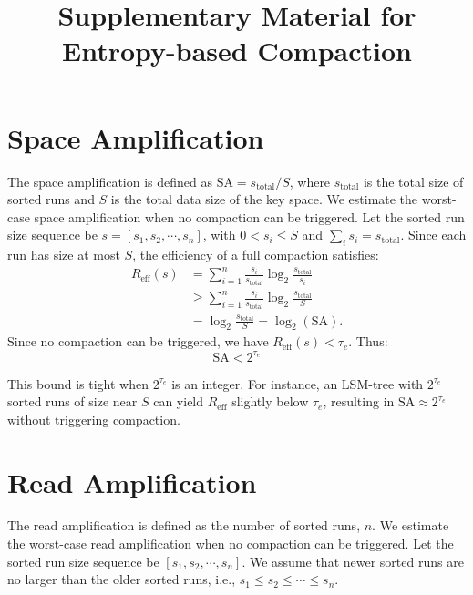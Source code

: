 \documentclass[sigconf]{acmart}
\begin{document}
\title{Supplementary Material for Entropy-based Compaction}
\maketitle

\section{Space Amplification}

The space amplification is defined as $\text{SA} = s_\text{total} / S$, where $s_\text{total}$ is the total size of sorted runs and $S$ is the total data size of the key space. We estimate the worst-case space amplification when no compaction can be triggered. Let the sorted run size sequence be $s = [s_1,s_2,\cdots,s_n]$, with $0 < s_i \le S$ and $\sum_i s_i = s_\text{total}$. Since each run has size at most $S$, the efficiency of a full compaction satisfies:
\begin{align*}
R_\text{eff}(s)
&= \sum_{i=1}^n \frac{s_i}{s_\text{total}} \log_2 \frac{s_\text{total}}{s_i} \\
&\ge \sum_{i=1}^n \frac{s_i}{s_\text{total}} \log_2 \frac{s_\text{total}}{S} \\
&= \log_2 \frac{s_\text{total}}{S}
= \log_2(\text{SA}).
\end{align*}
Since no compaction can be triggered, we have $R_\text{eff}(s) < \tau_e$. Thus:
$$\text{SA} < 2^{\tau_e}$$

This bound is tight when $2^{\tau_e}$ is an integer. For instance, an LSM-tree with $2^{\tau_e}$ sorted runs of size near $S$ can yield $R_\text{eff}$ slightly below $\tau_e$, resulting in $\text{SA} \approx 2^{\tau_e}$ without triggering compaction.

\section{Read Amplification}

The read amplification is defined as the number of sorted runs, $n$. We estimate the worst-case read amplification when no compaction can be triggered. Let the sorted run size sequence be $[s_1, s_2, \cdots, s_n]$. We assume that newer sorted runs are no larger than the older sorted runs, i.e., $s_1\leq s_2\leq \cdots \leq s_n$.
\end{document}
